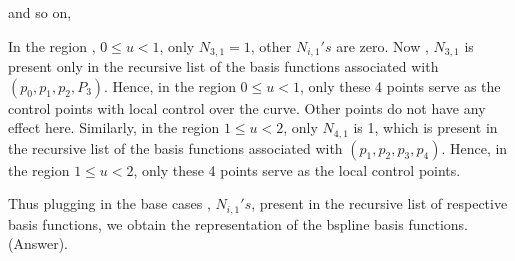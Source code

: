 \documentclass{article}
\begin{document}
and so on, \newline

In the region , $0 \leq u < 1$, only $N_{3,1}=1$, other $N_{i,1}'s$ are zero. Now , $N_{3,1}$ is present only in the recursive list of the basis functions associated with  $(p_0, p_1, p_2, P_3)$. Hence, in the region $0 \leq u < 1$, only these 4 points serve as the control points with local control over the curve. Other points do not have any effect here. Similarly, in the region $1 \leq u < 2$, only $N_{4,1}$ is 1, which is present in the recursive list of the basis functions associated with $(p_1, p_2, p_3,p_4)$. Hence, in the region $1 \leq u < 2$, only these 4 points serve as the local control points. \newline

Thus plugging in the base cases , $N_{i,1}'s$, present in the recursive list of respective basis functions, we obtain the representation of the bspline basis functions. (Answer). \newline
\end{document}
